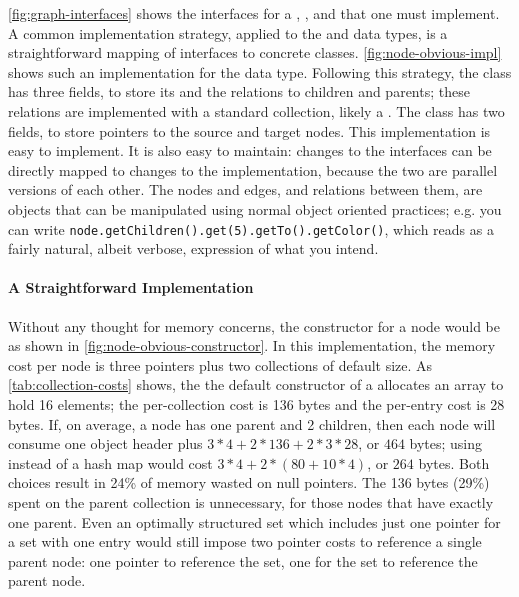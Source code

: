 \autoref{fig:graph-interfaces} shows the interfaces for a ,
, and  that one must implement. A common implementation
strategy, applied to the  and  data types, is a
straightforward mapping of interfaces to concrete classes.
\autoref{fig:node-obvious-impl} shows such an implementation for the
 data type. Following this
strategy, the  class has three fields, to store its 
and the relations to children and parents; these relations are implemented with a
standard collection, likely a . The  class has two
fields, to store pointers to the source and target nodes. This implementation is
easy to implement. It is also easy to maintain: changes to the interfaces can be
directly mapped to changes to the implementation, because the two are parallel
versions of each other. The nodes and edges, and relations between them, are
objects that can be manipulated using normal object oriented practices; e.g. you
can write \texttt{node.getChildren().get(5).getTo()\-.getColor()}, which reads
as a fairly natural, albeit verbose, expression of what you intend.

\paragraph{A Straightforward Implementation}
Without any thought for memory concerns, the constructor for a node would be as
shown in \autoref{fig:node-obvious-constructor}. In this implementation, the
memory cost per node is three pointers plus two collections of default size. As
\autoref{tab:collection-costs} shows, the the default constructor of a
 allocates an array to hold 16 elements; the per-collection cost
is 136 bytes and the per-entry cost is 28 bytes. If, on average, a node has one
parent and 2 children, then each node will consume one object header plus $3*4
+2*136 + 2*3*28$, or $464$ bytes; using  instead of a hash map
would cost $3*4+ 2*(80 + 10*4)$, or $264$ bytes. Both choices result in 24\% of
memory wasted on null pointers.
The 136 bytes (29\%) spent on the parent collection is unnecessary, for those
nodes that have exactly one parent. Even an optimally structured set which
includes just one pointer for a set with one entry would still impose two pointer
costs to reference a single parent node: one pointer to reference the set, one
for the set to reference the parent node.

